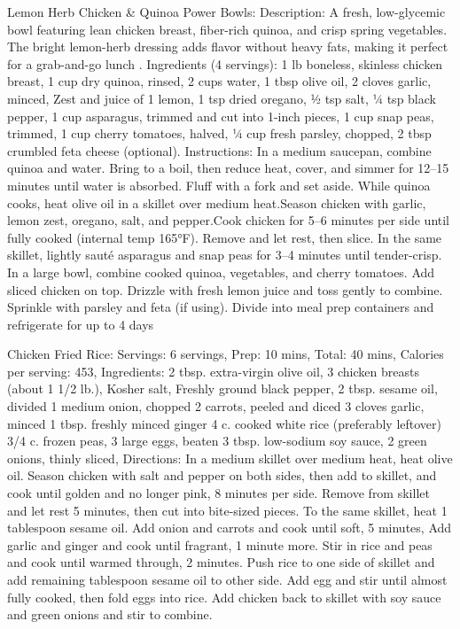 Lemon Herb Chicken \& Quinoa Power Bowls: Description: A fresh, low-glycemic bowl featuring lean chicken breast, fiber-rich quinoa, and crisp spring vegetables. The bright lemon-herb dressing adds flavor without heavy fats, making it perfect for a grab-and-go lunch . Ingredients (4 servings): 1 lb boneless, skinless chicken breast, 1 cup dry quinoa, rinsed, 2 cups water, 1 tbsp olive oil, 2 cloves garlic, minced, Zest and juice of 1 lemon, 1 tsp dried oregano, ½ tsp salt, ¼ tsp black pepper, 1 cup asparagus, trimmed and cut into 1-inch pieces, 1 cup snap peas, trimmed, 1 cup cherry tomatoes, halved, ¼ cup fresh parsley, chopped, 2 tbsp crumbled feta cheese (optional). Instructions: In a medium saucepan, combine quinoa and water. Bring to a boil, then reduce heat, cover, and simmer for 12–15 minutes until water is absorbed. Fluff with a fork and set aside. While quinoa cooks, heat olive oil in a skillet over medium heat.Season chicken with garlic, lemon zest, oregano, salt, and pepper.Cook chicken for 5–6 minutes per side until fully cooked (internal temp 165°F). Remove and let rest, then slice. In the same skillet, lightly sauté asparagus and snap peas for 3–4 minutes until tender-crisp. In a large bowl, combine cooked quinoa, vegetables, and cherry tomatoes. Add sliced chicken on top. Drizzle with fresh lemon juice and toss gently to combine. Sprinkle with parsley and feta (if using). Divide into meal prep containers and refrigerate for up to 4 days
\par

Chicken Fried Rice: Servings: 6 servings, Prep: 10 mins, Total: 40 mins, Calories per serving: 453, Ingredients: 2 tbsp. extra-virgin olive oil, 3 chicken breasts (about 1 1/2 lb.), Kosher salt, Freshly ground black pepper, 2 tbsp. sesame oil, divided 1 medium onion, chopped 2 carrots, peeled and diced 3 cloves garlic, minced 1 tbsp. freshly minced ginger 4 c. cooked white rice (preferably leftover) 3/4 c. frozen peas, 3 large eggs, beaten 3 tbsp. low-sodium soy sauce, 2 green onions, thinly sliced, Directions: In a medium skillet over medium heat, heat olive oil. Season chicken with salt and pepper on both sides, then add to skillet, and cook until golden and no longer pink, 8 minutes per side. Remove from skillet and let rest 5 minutes, then cut into bite-sized pieces. To the same skillet, heat 1 tablespoon sesame oil. Add onion and carrots and cook until soft, 5 minutes, Add garlic and ginger and cook until fragrant, 1 minute more. Stir in rice and peas and cook until warmed through, 2 minutes. Push rice to one side of skillet and add remaining tablespoon sesame oil to other side. Add egg and stir until almost fully cooked, then fold eggs into rice. Add chicken back to skillet with soy sauce and green onions and stir to combine.
\par

